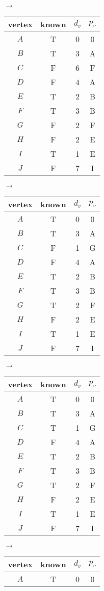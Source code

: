 \documentclass[12pt]{article}
\begin{document}
\begin{center}
$\rightarrow$
\begin{tabular}{ c c c c } 
vertex & known & $d_v$ & $p_v$ \\
 \hline
$A$ & T & 0 & 0 \\
$B$ & T & 3 & A \\
$C$ & F & 6 & F \\
$D$ & F & 4 & A \\
$E$ & T & 2 & B \\
$F$ & T & 3 & B \\
$G$ & F & 2 & F \\
$H$ & F & 2 & E \\
$I$ & T & 1 & E \\
$J$ & F & 7 & I \\
\end{tabular}
$\rightarrow$
\begin{tabular}{ c c c c } 
vertex & known & $d_v$ & $p_v$ \\
 \hline
$A$ & T & 0 & 0 \\
$B$ & T & 3 & A \\
$C$ & F & 1 & G \\
$D$ & F & 4 & A \\
$E$ & T & 2 & B \\
$F$ & T & 3 & B \\
$G$ & T & 2 & F \\
$H$ & F & 2 & E \\
$I$ & T & 1 & E \\
$J$ & F & 7 & I \\
\end{tabular}
$\rightarrow$
\begin{tabular}{ c c c c } 
vertex & known & $d_v$ & $p_v$ \\
 \hline
$A$ & T & 0 & 0 \\
$B$ & T & 3 & A \\
$C$ & T & 1 & G \\
$D$ & F & 4 & A \\
$E$ & T & 2 & B \\
$F$ & T & 3 & B \\
$G$ & T & 2 & F \\
$H$ & F & 2 & E \\
$I$ & T & 1 & E \\
$J$ & F & 7 & I \\
\end{tabular}
$\rightarrow$
\begin{tabular}{ c c c c } 
vertex & known & $d_v$ & $p_v$ \\
 \hline
$A$ & T & 0 & 0 \\

\end{tabular}
\end{center}
\end{document}
